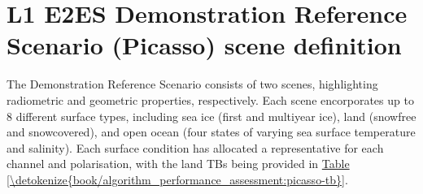 \documentclass[letterpaper,10pt,english]{jupyterBook}
\begin{document}
\section{L1 E2ES Demonstration Reference Scenario (Picasso) scene definition}
\label{\detokenize{book/algorithm_performance_assessment:l1-e2es-demonstration-reference-scenario-picasso-scene-definition}}
\sphinxAtStartPar
The Demonstration Reference Scenario consists of two scenes, highlighting radiometric and geometric properties, respectively.
Each scene encorporates up to 8 different surface types, including sea ice (first and multi\sphinxhyphen{}year ice), land (snow\sphinxhyphen{}free and snow\sphinxhyphen{}covered), and open ocean (four states of varying sea surface temperature and salinity).
Each surface condition has allocated a representative {\hyperref[\detokenize{book/acronyms:term-TB}]{}} for each {\hyperref[\detokenize{book/acronyms:term-CIMR}]{}} channel and polarisation, with the land TBs being provided in \hyperref[\detokenize{book/algorithm_performance_assessment:picasso-tb}]{Table \ref{\detokenize{book/algorithm_performance_assessment:picasso-tb}}}.
\end{document}
